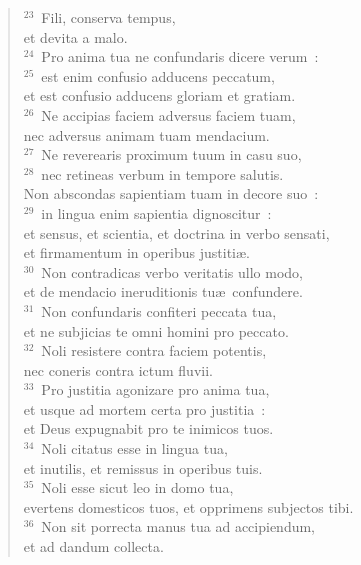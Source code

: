 \begin{verse}${}^{23}$~Fili, conserva tempus,\\ et devita a malo.\\
${}^{24}$~Pro anima tua ne confundaris dicere verum~:\\
${}^{25}$~est enim confusio adducens peccatum,\\ et est confusio adducens gloriam et gratiam.\\
${}^{26}$~Ne accipias faciem adversus faciem tuam,\\ nec adversus animam tuam mendacium.\\
${}^{27}$~Ne reverearis proximum tuum in casu suo,\\
${}^{28}$~nec retineas verbum in tempore salutis.\\ Non abscondas sapientiam tuam in decore suo~:\\
${}^{29}$~in lingua enim sapientia dignoscitur~:\\ et sensus, et scientia, et doctrina in verbo sensati,\\ et firmamentum in operibus justiti\ae .\\
${}^{30}$~Non contradicas verbo veritatis ullo modo,\\ et de mendacio ineruditionis tu\ae\ confundere.\\
${}^{31}$~Non confundaris confiteri peccata tua,\\ et ne subjicias te omni homini pro peccato.\\
${}^{32}$~Noli resistere contra faciem potentis,\\ nec coneris contra ictum fluvii.\\
${}^{33}$~Pro justitia agonizare pro anima tua,\\ et usque ad mortem certa pro justitia~:\\ et Deus expugnabit pro te inimicos tuos.\\
${}^{34}$~Noli citatus esse in lingua tua,\\ et inutilis, et remissus in operibus tuis.\\
${}^{35}$~Noli esse sicut leo in domo tua,\\ evertens domesticos tuos, et opprimens subjectos tibi.\\
${}^{36}$~Non sit porrecta manus tua ad accipiendum,\\ et ad dandum collecta.\end{verse}


